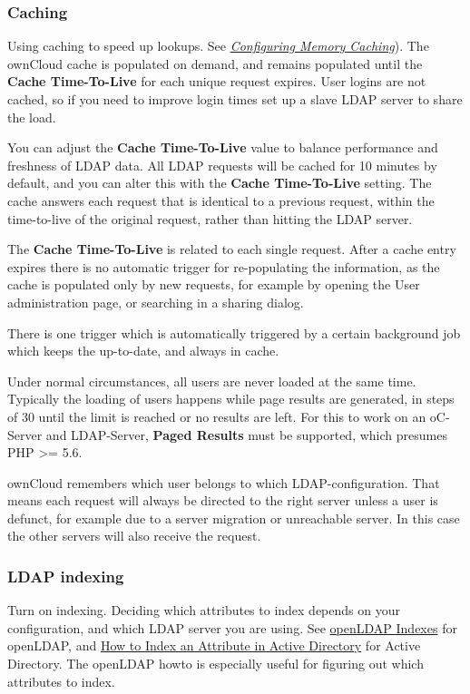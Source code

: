 \documentclass[letterpaper,10pt,english]{sphinxmanual}
\begin{document}
\subsubsection{Caching}
\label{configuration_user/user_auth_ldap:caching}
Using caching to speed up lookups. See {\hyperref[configuration_server/caching_configuration::doc]{\emph{\emph{Configuring Memory Caching}}}}). The ownCloud cache is populated on demand, and remains populated until the \textbf{Cache Time-To-Live} for each unique request expires. User logins are not cached, so if you need to improve login times set up a slave LDAP server to share the load.

You can adjust the \textbf{Cache Time-To-Live} value to balance performance and
freshness of LDAP data. All LDAP requests will be cached for 10 minutes by
default, and you can alter this with the \textbf{Cache Time-To-Live} setting. The
cache answers each request that is identical to a previous request, within the
time-to-live of the original request, rather than hitting the LDAP server.

The \textbf{Cache Time-To-Live} is related to each single request. After a cache
entry expires there is no automatic trigger for re-populating the information,
as the cache is populated only by new requests, for example by opening the
User administration page, or searching in a sharing dialog.

There is one trigger which is automatically triggered by a certain background
job which keeps the  up-to-date, and always in cache.

Under normal circumstances, all users are never loaded at the same time.
Typically the loading of users happens while page results are generated, in
steps of 30 until the limit is reached or no results are left. For this to
work on an oC-Server and LDAP-Server, \textbf{Paged Results} must be supported,
which presumes PHP \textgreater{}= 5.6.

ownCloud remembers which user belongs to which LDAP-configuration. That means
each request will always be directed to the right server unless a user is
defunct, for example due to a server migration or unreachable server. In this
case the other servers will also receive the request.


\subsubsection{LDAP indexing}
\label{configuration_user/user_auth_ldap:ldap-indexing}
Turn on indexing. Deciding which attributes to index depends on your configuration, and which LDAP server you are using. See \href{http://www.openldap.org/doc/admin24/tuning.html\#Indexes}{openLDAP Indexes} for openLDAP, and \href{https://technet.microsoft.com/en-us/library/aa995762(v=exchg.65).aspx}{How to Index an Attribute in Active Directory} for Active Directory. The openLDAP howto is especially useful for figuring out which attributes to index.
\end{document}
